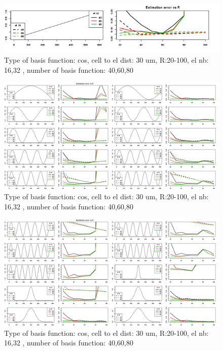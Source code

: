 \documentclass[12pt,a4paper]{article}
\begin{document}
\begin{figure}[h]
\includegraphics[width=15cm]{plots/error_Rtest_cos_patt1_el_both.png}
\caption{Type of basis function: cos, cell to el dist: 30 um, R:20-100, el nb: 16,32 , number of basis function: 40,60,80}
\label{fig:error_cos0}
\end{figure}


\begin{figure}[h]
\includegraphics[width=15cm]{plots/error_Rtest_cos_patt3_12_el_both.png}
\caption{Type of basis function: cos, cell to el dist: 30 um, R:20-100, el nb: 16,32 , number of basis function: 40,60,80}
\label{fig:error_cos}
\end{figure}

\begin{figure}[h]
\includegraphics[width=15cm]{plots/error_Rtest_cos_patt13_22_el_both.png}
\caption{Type of basis function: cos, cell to el dist: 30 um, R:20-100, el nb: 16,32 , number of basis function: 40,60,80}
\label{fig:error_cos2}
\end{figure}
\end{document}
